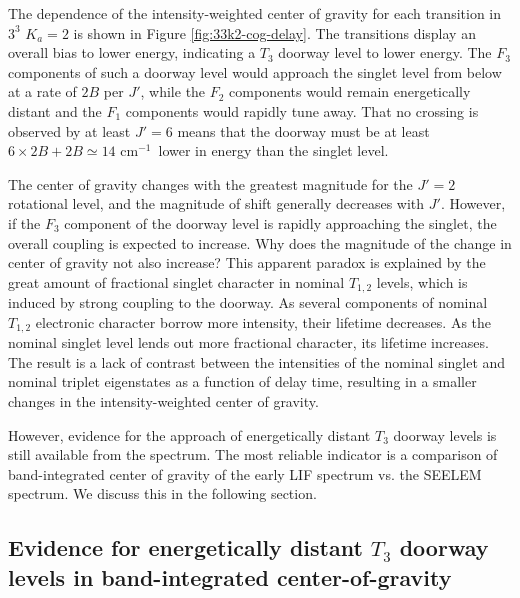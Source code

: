 \documentclass[12pt]{mitthesis}
\newcommand{\rcm}{cm$^{-1}$}
\newcommand{\Ka}[1]{$K_a\!\!=\!#1$}
\begin{document}
The dependence of the intensity-weighted center of gravity for each
transition in $3^3$ \Ka{2} is shown in Figure
\ref{fig:33k2-cog-delay}.  The transitions display an overall bias to
lower energy, indicating a $T_3$ doorway level to lower energy.  The
$F_3$ components of such a doorway level would approach the singlet
level from below at a rate of $2B$ per $J'$, while the $F_2$
components would remain energetically distant and the $F_1$ components
would rapidly tune away.  That no crossing is observed by at least
$J'=6$ means that the doorway must be at least $6\times2B + 2B \simeq
14$ \rcm\ lower in energy than the singlet level.

The center of gravity changes with the greatest magnitude for the
$J'=2$ rotational level, and the magnitude of shift generally
decreases with $J'$.  However, if the $F_3$ component of the doorway
level is rapidly approaching the singlet, the overall coupling is
expected to increase.  Why does the magnitude of the change in center
of gravity not also increase?  This apparent paradox is explained by
the great amount of fractional singlet character in nominal $T_{1,2}$
levels, which is induced by strong coupling to the doorway.  As
several components of nominal $T_{1,2}$ electronic character borrow
more intensity, their lifetime decreases.  As the nominal singlet
level lends out more fractional character, its lifetime increases.
The result is a lack of contrast between the intensities of the
nominal singlet and nominal triplet eigenstates as a function of delay
time, resulting in a smaller changes in the intensity-weighted center
of gravity.

However, evidence for the approach of energetically distant $T_3$
doorway levels is still available from the spectrum.  The most
reliable indicator is a comparison of band-integrated center of
gravity of the early LIF spectrum vs. the SEELEM spectrum.  We discuss
this in the following section.

\subsection{Evidence for energetically distant $T_3$ doorway levels in
  band-integrated center-of-gravity}

\end{document}
